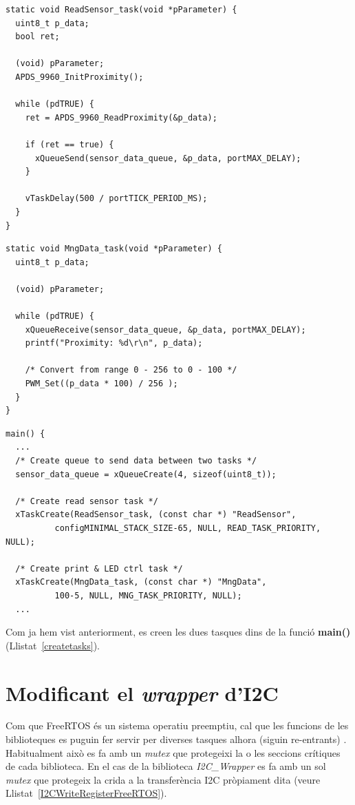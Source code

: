 \begin{lstlisting}[style=customc,caption={Tasca ReadSensor },label=readsensor_task]
static void ReadSensor_task(void *pParameter) {
  uint8_t p_data;
  bool ret;

  (void) pParameter;
  APDS_9960_InitProximity();

  while (pdTRUE) {
    ret = APDS_9960_ReadProximity(&p_data);

    if (ret == true) {
      xQueueSend(sensor_data_queue, &p_data, portMAX_DELAY);
    }

    vTaskDelay(500 / portTICK_PERIOD_MS);
  }
}
\end{lstlisting}

\begin{lstlisting}[style=customc,caption={Tasca MngData},label=mgndata_task]
static void MngData_task(void *pParameter) {
  uint8_t p_data;

  (void) pParameter;

  while (pdTRUE) {
    xQueueReceive(sensor_data_queue, &p_data, portMAX_DELAY);
    printf("Proximity: %d\r\n", p_data);

    /* Convert from range 0 - 256 to 0 - 100 */
    PWM_Set((p_data * 100) / 256 );
  }
}
\end{lstlisting}



\begin{lstlisting}[style=customc,caption={Creació de tasques},label=createtasks]
main() {
  ...
  /* Create queue to send data between two tasks */
  sensor_data_queue = xQueueCreate(4, sizeof(uint8_t));

  /* Create read sensor task */
  xTaskCreate(ReadSensor_task, (const char *) "ReadSensor",
          configMINIMAL_STACK_SIZE-65, NULL, READ_TASK_PRIORITY, NULL);

  /* Create print & LED ctrl task */
  xTaskCreate(MngData_task, (const char *) "MngData",
          100-5, NULL, MNG_TASK_PRIORITY, NULL);
  ...
\end{lstlisting}

Com ja hem vist anteriorment, es creen les dues tasques dins de la funció {\bf main()} (Llistat~\ref{createtasks}).

\section{Modificant el {\em wrapper} d'I2C}
\label{sec:wrapperI2C}
Com que FreeRTOS és un sistema operatiu preemptiu, cal que les funcions de les biblioteques es puguin fer servir per diverses tasques alhora (siguin re-entrants) \cite[236]{FreeRTOSBook}. Habitualment això es fa amb un {\em mutex} que protegeixi la o les seccions crítiques de cada biblioteca. En el cas de la biblioteca {\em I2C\_Wrapper} es fa amb un sol {\em mutex} que protegeix la crida a la transferència \gls{I2C} pròpiament dita (veure Llistat~\ref{I2CWriteRegisterFreeRTOS}).

